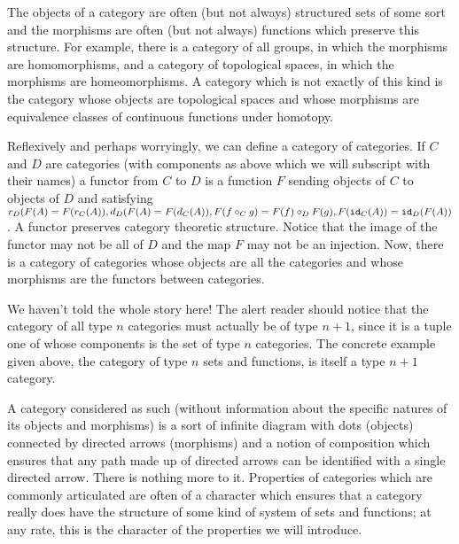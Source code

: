 \documentclass[12pt]{book}
\begin{document}
The objects of a category are often (but not always) structured sets of some sort and the morphisms are often (but not always) functions which preserve this structure.
For example, there is a category of all groups, in which the morphisms are homomorphisms, and a category of topological spaces, in which the morphisms are homeomorphisms.  A category which is not exactly of this kind is the category whose objects are topological spaces and whose morphisms are equivalence classes of continuous functions under homotopy.

Reflexively and perhaps worryingly, we can define a category of categories.  If $C$ and $D$ are categories (with components as above which we will subscript with their names) a functor from $C$ to $D$ is a function $F$ sending objects of $C$ to objects of $D$ and satisfying $r_D(F(A)=F(r_C(A)),
d_D(F(A)=F(d_C(A)), F(f \circ_C g) = F(f) \circ_D F(g), F({\tt id}_C(A))={\tt id}_D(F(A))$.  A functor preserves category theoretic structure.  Notice that the image of the functor may not be all of $D$ and the map $F$ may not be an injection.  Now, there is a category of categories whose objects
are all the categories and whose morphisms are the functors between categories.

We haven't told the whole story here!  The alert reader should notice that the category of all type $n$ categories must actually be of
type $n+1$, since it is a tuple one of whose components is the set of type $n$ categories.  The concrete example given above, the category of type $n$ sets and functions, is itself a type $n+1$ category.

A category considered as such (without information about the specific natures of its objects and morphisms) is a sort of infinite diagram with dots (objects) connected by directed arrows (morphisms) and a notion of composition which ensures that any path made up of directed arrows can be identified with a single directed arrow.  There is nothing more to it.  Properties of categories which are commonly articulated are often of a character which ensures that a category really does have the structure of some kind of system of sets and functions; at any rate, this is the character of the properties we will introduce.
\end{document}
